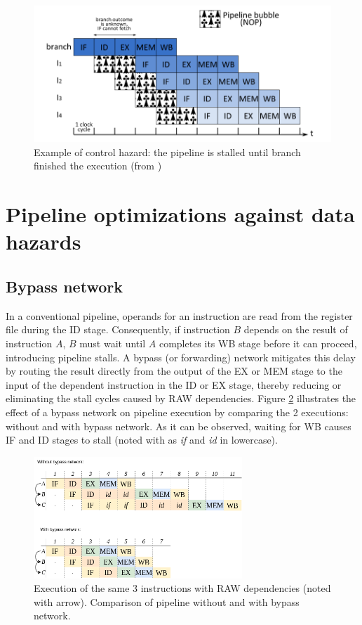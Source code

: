 \begin{figure}[H]
    \includegraphics[width=\textwidth]{figures/pipeline-bubbles.png}
    \caption{Example of control hazard: the pipeline is stalled until branch finished the execution (from \cite{perais_increasing_2016})}
    \label{fig:bubbles}
\end{figure}

\section{Pipeline optimizations against data hazards}

\subsection{Bypass network}

In a conventional pipeline, operands for an instruction are read from the register file during the ID stage. Consequently, if instruction $B$ depends on the result of instruction $A$, $B$ must wait until $A$ completes its WB stage before it can proceed, introducing pipeline stalls. A bypass (or forwarding) network mitigates this delay by routing the result directly from the output of the EX or MEM stage to the input of the dependent instruction in the ID or EX stage, thereby reducing or eliminating the stall cycles caused by RAW dependencies. Figure \ref{fig:bypass-network} illustrates the effect of a bypass network on pipeline execution by comparing the 2 executions: without and with bypass network. As it can be observed, waiting for WB causes IF and ID stages to stall (noted with as \textit{if} and \textit{id} in lowercase).

\begin{figure}[H]
    \centering
    \includegraphics[width=0.7\textwidth]{figures/bypass network.png}
    \caption{Execution of the same 3 instructions with RAW dependencies (noted with arrow). Comparison of pipeline without and with bypass network.}
    \label{fig:bypass-network}
\end{figure}

